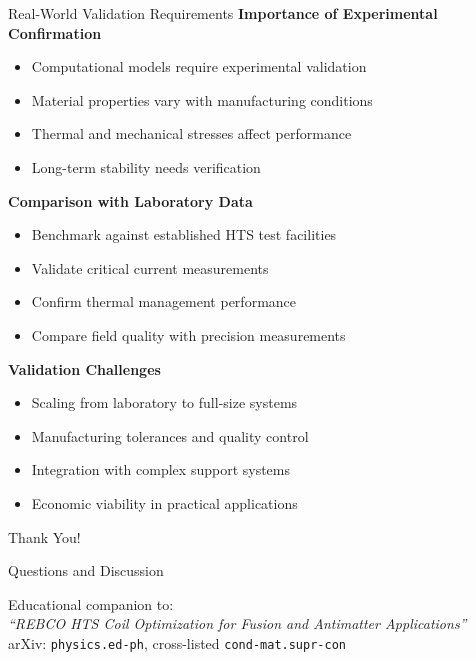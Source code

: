 \documentclass[aspectratio=169,xcolor={table,dvipsnames}]{beamer}
\begin{document}
\begin{frame}{Real-World Validation Requirements}
    \textbf{Importance of Experimental Confirmation}
    \begin{itemize}
        \item Computational models require experimental validation
        \item Material properties vary with manufacturing conditions
        \item Thermal and mechanical stresses affect performance
        \item Long-term stability needs verification
    \end{itemize}
    
    \vspace{0.5cm}
    \textbf{Comparison with Laboratory Data}
    \begin{itemize}
        \item Benchmark against established HTS test facilities
        \item Validate critical current measurements
        \item Confirm thermal management performance
        \item Compare field quality with precision measurements
    \end{itemize}
    
    \vspace{0.5cm}
    \textbf{Validation Challenges}
    \begin{itemize}
        \item Scaling from laboratory to full-size systems
        \item Manufacturing tolerances and quality control
        \item Integration with complex support systems
        \item Economic viability in practical applications
    \end{itemize}
\end{frame}

\begin{frame}
    \begin{center}
        \Huge Thank You!
        
        \vspace{1cm}
        \Large Questions and Discussion
        
        \vspace{1cm}
        \normalsize
        Educational companion to:\\
        \textit{``REBCO HTS Coil Optimization for Fusion and Antimatter Applications''}\\
        \vspace{0.3cm}
        arXiv: \texttt{physics.ed-ph}, cross-listed \texttt{cond-mat.supr-con}
    \end{center}
\end{frame}
\end{document}
